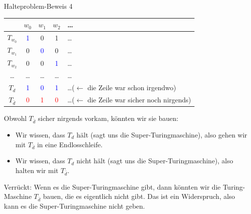 \begin{frame}{Halteproblem-Beweis 4}
    \begin{table}
        \centering
        \begin{tabular}{ccccl}
            \toprule
                     & $w_0$ & $w_1$ & $w_2$ & \dots\\
             \midrule
             $T_{w_0}$ & \textcolor{blue}{1} & 0 & 1 & \dots\\
             $T_{w_1}$ & 0 & \textcolor{blue}{0} & 0 & \dots\\
             $T_{w_2}$ & 0 & 0 & \textcolor{blue}{1} & \dots\\
             \dots   &  \dots & \dots  & \dots  & \dots \\
             $T_d$ & \textcolor{blue}{1} & \textcolor{blue}{0} & \textcolor{blue}{1} &\dots ($\leftarrow$ die Zeile war schon irgendwo) \\
             $T_{\bar{d}}$ & \textcolor{red}{0} & \textcolor{red}{1} & \textcolor{red}{0} & \dots($\leftarrow$ die Zeile war sicher noch nirgends) \\
             \bottomrule
        \end{tabular}
    \end{table}
    Obwohl $T_{\bar{d}}$ sicher nirgends vorkam, könnten wir sie bauen:
    \begin{itemize}
        \item Wir wissen, dass $T_d$ hält (sagt uns die Super-Turingmaschine), also gehen wir mit $T_{\bar{d}}$ in eine Endlosschleife.
        \item Wir wissen, dass $T_d$ nicht hält (sagt uns die Super-Turingmaschine), also halten wir mit $T_{\bar{d}}$.
    \end{itemize}
    \pause
    Verrückt: Wenn es die Super-Turingmaschine gibt, dann könnten wir die Turing-Maschine $T_{\bar{d}}$ bauen, die es eigentlich nicht gibt. Das ist ein Widerspruch, also kann es die Super-Turingmaschine nicht geben.
\end{frame}
